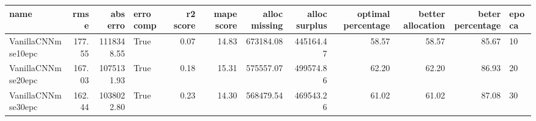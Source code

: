 \begin{tabular}{lrrlrrrrrrrl}
\toprule
name & rmse & abs erro & erro comp & r2 score & mape score & alloc missing & alloc surplus & optimal percentage & better allocation & beter percentage & epoca \\
\midrule
VanillaCNNmse10epc & 177.55 & 1118348.55 & True & 0.07 & 14.83 & 673184.08 & 445164.47 & 58.57 & 58.57 & 85.67 & 10 \\
VanillaCNNmse20epc & 167.03 & 1075131.93 & True & 0.18 & 15.31 & 575557.07 & 499574.86 & 62.20 & 62.20 & 86.93 & 20 \\
VanillaCNNmse30epc & 162.44 & 1038022.80 & True & 0.23 & 14.30 & 568479.54 & 469543.26 & 61.02 & 61.02 & 87.08 & 30 \\
\bottomrule
\end{tabular}
